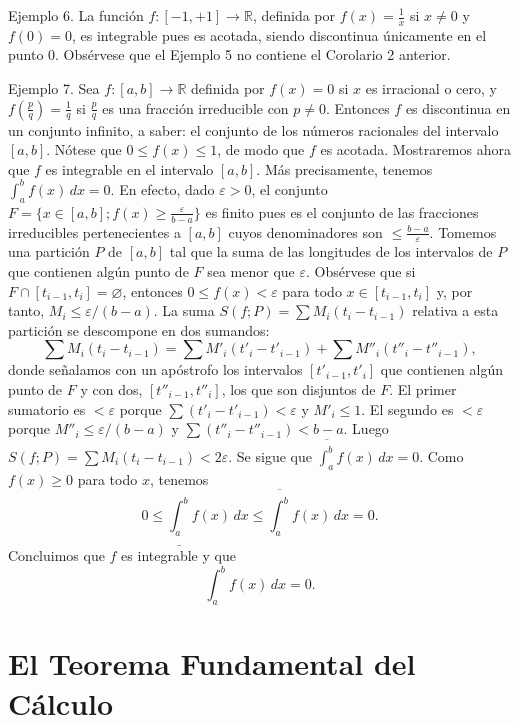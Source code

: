\documentclass[12pt,oneside]{book}
\begin{document}
Ejemplo 6. La función \( f: [-1, +1] \to \mathbb{R} \), definida por \( f(x) = \frac{1}{x} \) si \( x \neq 0 \) y \( f(0) = 0 \), es integrable pues es acotada, siendo discontinua únicamente en el punto 0. Obsérvese que el Ejemplo 5 no contiene el Corolario 2 anterior.

Ejemplo 7. Sea \( f: [a, b] \to \mathbb{R} \) definida por \( f(x) = 0 \) si \( x \) es irracional o cero, y \( f\left(\frac{p}{q}\right) = \frac{1}{q} \) si \( \frac{p}{q} \) es una fracción irreducible con \( p \neq 0 \). Entonces \( f \) es discontinua en un conjunto infinito, a saber: el conjunto de los números racionales del intervalo \([a, b]\). Nótese que \( 0 \leq f(x) \leq 1 \), de modo que \( f \) es acotada. Mostraremos ahora que \( f \) es integrable en el intervalo \([a, b]\). Más precisamente, tenemos \( \int_a^b f(x) \, dx = 0 \). En efecto, dado \( \varepsilon > 0 \), el conjunto \( F = \{ x \in [a, b]; f(x) \geq \frac{\varepsilon}{b-a} \} \) es finito pues es el conjunto de las fracciones irreducibles pertenecientes a \([a, b]\) cuyos denominadores son \( \leq \frac{b-a}{\varepsilon} \). Tomemos una partición \( P \) de \([a, b]\) tal que la suma de las longitudes de los intervalos de \(P\) que contienen algún punto de \(F\) sea menor que \(\varepsilon\). Obsérvese que si \(F \cap [t_{i-1}, t_i] = \varnothing\), entonces \(0 \leq f(x) < \varepsilon\) para todo \(x \in [t_{i-1}, t_i]\) y, por tanto, \(M_i \leq \varepsilon/(b-a)\). La suma \(S(f; P) = \sum M_i (t_i - t_{i-1})\) relativa a esta partición se descompone en dos sumandos:
\[
\sum M_i (t_i - t_{i-1}) = \sum M'_i (t'_i - t'_{i-1}) + \sum M''_i (t''_i - t''_{i-1}),
\]
donde señalamos con un apóstrofo los intervalos \([t'_{i-1}, t'_i]\) que contienen algún punto de \(F\) y con dos, \([t''_{i-1}, t''_i]\), los que son disjuntos de \(F\). El primer sumatorio es \(< \varepsilon\) porque \(\sum (t'_i - t'_{i-1}) < \varepsilon\) y \(M'_i \leq 1\). El segundo es \(< \varepsilon\) porque \(M''_i \leq \varepsilon/(b-a)\) y \(\sum (t''_i - t''_{i-1}) < b-a\). Luego \(S(f; P) = \sum M_i (t_i - t_{i-1}) < 2\varepsilon\). Se sigue que \(\overline{\int_a^b} f(x) \, dx = 0\). Como \(f(x) \geq 0\) para todo \(x\), tenemos
\[
0 \leq \underline{\int_a^b} f(x) \, dx \leq \overline{\int_a^b} f(x) \, dx = 0.
\]
Concluimos que \(f\) es integrable y que
\[
\int_a^b f(x) \, dx = 0.
\]

\section{El Teorema Fundamental del Cálculo}
\end{document}
